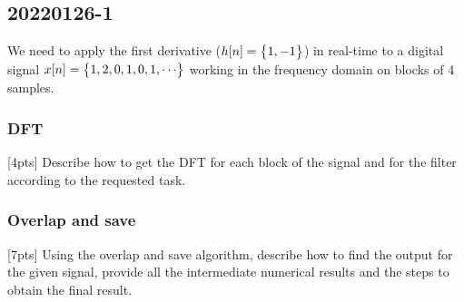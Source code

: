 \pagebreak\subsection{20220126-1}
    We need to apply the first derivative ($h[n]=\begin{Bmatrix} {1,-1} \end{Bmatrix}$) in real-time to a digital signal $x[n]=\begin{Bmatrix} {1,2,0,1,0,1,\cdots} \end{Bmatrix}$ working in the frequency domain on blocks of 4 samples.

    \subsubsection{DFT}
    [4pts] Describe how to get the DFT for each block of the signal and for the filter according to the requested task.


    \subsubsection{Overlap and save}
    [7pts] Using the overlap and save algorithm, describe how to find the output for the given signal, provide all the intermediate numerical results and the steps to obtain the final result.

